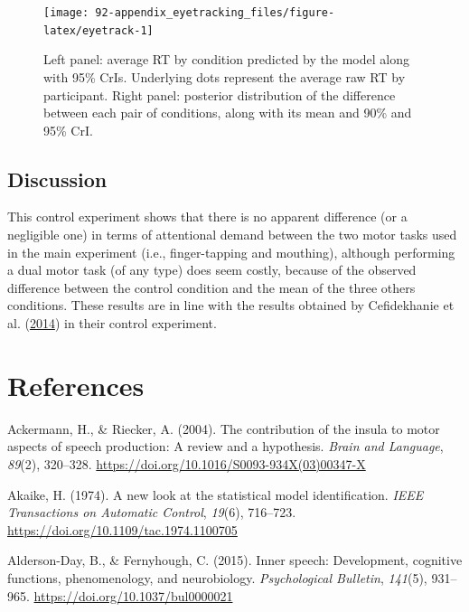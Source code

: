 \documentclass[a4paper,12pt,twoside,openright,oldfontcommands]{memoir}
\begin{document}
\begin{figure}[H]
\texttt{[image: 92-appendix\_eyetracking\_files/figure-latex/eyetrack-1]} \caption{Left panel: average RT by condition predicted by the model along with 95\% CrIs. Underlying dots represent the average raw RT by participant. Right panel: posterior distribution of the difference between each pair of conditions, along with its mean and 90\% and 95\% CrI.}\label{fig:eyetrack}
\end{figure}

\hypertarget{discussion-5}{%
\section{Discussion}\label{discussion-5}}

This control experiment shows that there is no apparent difference (or a negligible one) in terms of attentional demand between the two motor tasks used in the main experiment (i.e., finger-tapping and mouthing), although performing a dual motor task (of any type) does seem costly, because of the observed difference between the control condition and the mean of the three others conditions. These results are in line with the results obtained by Cefidekhanie et al. (\protect\hyperlink{ref-cefidekhanie_interaction_2014}{2014}) in their control experiment.

\hypertarget{references}{%
\chapter*{References}\label{references}}


\noindent
\setlength{\parindent}{-0.20in}
\setlength{\leftskip}{0.20in}
\setlength{\parskip}{8pt}

\hypertarget{refs}{}
\leavevmode\hypertarget{ref-ackermann_contribution_2004}{}%
Ackermann, H., \& Riecker, A. (2004). The contribution of the insula to motor aspects of speech production: A review and a hypothesis. \emph{Brain and Language}, \emph{89}(2), 320--328. \url{https://doi.org/10.1016/S0093-934X(03)00347-X}

\leavevmode\hypertarget{ref-akaike_new_1974}{}%
Akaike, H. (1974). A new look at the statistical model identification. \emph{IEEE Transactions on Automatic Control}, \emph{19}(6), 716--723. \url{https://doi.org/10.1109/tac.1974.1100705}

\leavevmode\hypertarget{ref-alderson-day_inner_2015}{}%
Alderson-Day, B., \& Fernyhough, C. (2015). Inner speech: Development, cognitive functions, phenomenology, and neurobiology. \emph{Psychological Bulletin}, \emph{141}(5), 931--965. \url{https://doi.org/10.1037/bul0000021}
\end{document}

